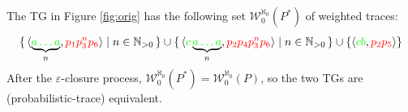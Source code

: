 \begin{example}
	The TG in Figure \ref{fig:orig} has the following set $\mathcal{W}_0^{\aleph_0}(P^*)$ of weighted traces:
$$\set{\braket{\underbrace{\color{green}a\dots a}_{n},{\color{red}p_1p_3^np_6}}|n\in \mathbb{N}_{>0}}\cup \set{\braket{{\color{green}c}\underbrace{\color{green}a\dots a}_{n},{\color{red}p_2p_4p_3^np_6}}|n\in \mathbb{N}_{>0}}\cup\{\braket{{\color{green}cb},{\color{red}p_2p_5}}\}$$
After the $\varepsilon$-closure process, $\mathcal{W}_0^{\aleph_0}(P^*)=\mathcal{W}_0^{\aleph_0}(P)$, so the two TGs are (probabilistic-trace) equivalent.
\end{example}
